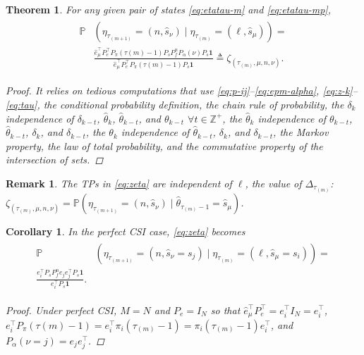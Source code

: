 \documentclass[journal,twoside,web]{ieeecolor}
\newtheorem{theorem}{Theorem}
\newtheorem{corollary}{Corollary}[theorem]
\newtheorem{remark}{Remark}
\begin{document}
\begin{theorem}\label{theorem:eta-probability}
    For any given pair of states \eqref{eq:etatau-m} and \eqref{eq:etatau-mp}, 
    \begin{align}\label{eq:zeta}
    \begin{aligned}
        \mathbb{P}&(\eta_{\tau_{(m+1)}}^{} = (n,\hat{s}_{\nu}) \mid \eta_{\tau_{(m)}}^{} = (\ell,\hat{s}_{\mu})) = \\
        & \frac{\hat{e}_{\mu}^{\top} P_{e}^{\top} P_{\pi}(\tau{(m)}-1) P_{s} P_{f}^{n} P_{\alpha}(\nu) P_{s} \mathbf{1}}{\hat{e}_{\mu}^{\top} P_{e}^{\top} P_{\pi}(\tau{(m)}-1) P_{s}\mathbf{1}} \triangleq \zeta_{(\tau_{(m)},\mu,n,\nu)}.
    \end{aligned}        
    \end{align}
\begin{proof}
    It relies on tedious computations that use \eqref{eq:p-ij}--\eqref{eq:epm-alpha}, \eqref{eq:z-k}--\eqref{eq:tau}, the conditional probability definition, the chain rule of probability, the $\delta_{k}$ independence of $\delta_{k-t}$, $\hat{\theta}_{k}$, $\hat{\theta}_{k-t}$, and $\theta_{k-t}$ $\forall t \in \mathbb{Z}^{+}$, the $\hat{\theta}_{k}$ independence of $\theta_{k-t}$, $\hat{\theta}_{k-t}$, $\delta_k$, and $\delta_{k-t}$,
    the $\theta_{k}$ independence of $\hat{\theta}_{k-t}$, $\delta_{k}$, and $\delta_{k-t}$,
    the Markov property, the law of total probability, 
    and the commutative property of the intersection of sets.
\end{proof}
\end{theorem}
\begin{remark}\label{rem:zeta-l-independence}
The TPs in \eqref{eq:zeta} are independent of $\ell$, the value of $\mathit{\Delta}_{\tau_{(m)}}$: $\zeta_{(\tau_{(m)},\mu,n,\nu)} = \mathbb{P}(\eta_{\tau_{(m+1)}}^{} \!= (n,\hat{s}_{\nu}) \mid \hat{\theta}_{\tau_{(m)}-1} \!= \hat{s}_{\mu})$.
\end{remark}
\begin{corollary}\label{corollary:eta}
In the \emph{perfect CSI} case, \eqref{eq:zeta} becomes
\begin{align}\label{eq:zeta-perfect-csi}
    \begin{aligned}
        \mathbb{P}&(\eta_{\tau_{(m+1)}}^{} = (n,\hat{s}_{\nu}=s_j) \mid \eta_{\tau_{(m)}}^{} = (\ell,\hat{s}_{\mu}=s_i)) = \\
        \frac{e_{i}^{\top} P_{s} P_{f}^{n} e_{j}e_{j}^{\top} P_{s} \mathbf{1}}{e_{i}^{\top} P_{s}\mathbf{1}}.
    \end{aligned}
\end{align}
\begin{proof}
    Under perfect CSI, $M=N$ and $P_e = I_{N}$ so that $\hat{e}_{\mu}^{\top} P_{e}^{\top} = e_{i}^{\top} I_{N} = e_{i}^{\top}$, $e_{i}^{\top} P_{\pi}(\tau{(m)}-1)=e_{i}^{\top}\pi_{i}(\tau_{(m)}-1)=\pi_{i}(\tau_{(m)}-1)e_{i}^{\top}$, and $P_{\alpha}(\nu=j)=e_{j}e_{j}^{\top}$.
\end{proof}
\end{corollary}
\end{document}
